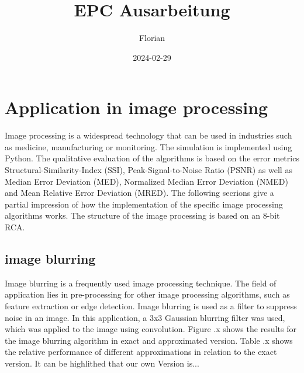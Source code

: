 \documentclass[]{IEEEconf}
\title{EPC Ausarbeitung}
\author{Florian }
\date{2024-02-29}
\begin{document}
\maketitle

\section{Application in image processing}
Image processing is a widespread technology that can be used in industries such as medicine, manufacturing or monitoring. The simulation is implemented using Python. The qualitative evaluation of the algorithms is based on the error metrics Structural-Similarity-Index (SSI), Peak-Signal-to-Noise Ratio (PSNR) as well as Median Error Deviation (MED), Normalized Median Error Deviation (NMED) and Mean Relative Error Deviation (MRED). The following secrions give a partial impression of how the implementation of the specific image processing algorithms works. The structure of the image processing is based on an 8-bit RCA.

\subsection{image blurring}
Image blurring is a frequently used image processing technique. The field of application lies in pre-processing for other image processing algorithms, such as feature extraction or edge detection. Image blurring is used as a filter to suppress noise in an image. In this application, a 3x3 Gaussian blurring filter was used, which was applied to the image using convolution.
Figure .x shows the results for the image blurring algorithm in exact and approximated version.
Table .x shows the relative performance of different approximations in relation to the exact version. It can be highlithed that our own Version is...
\end{document}
